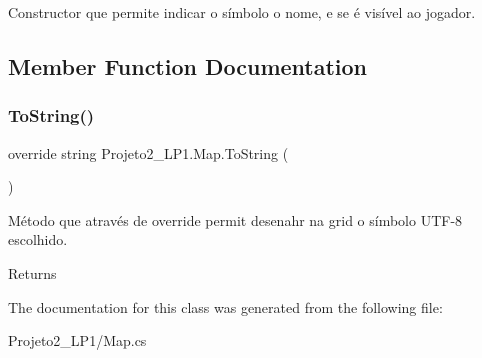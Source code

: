 Constructor que permite indicar o símbolo o nome, e se é visível ao jogador. 



\subsection{Member Function Documentation}
\mbox{\label{class_projeto2___l_p1_1_1_map_a4693bc7aa33a5c2c98d99dcd5dc1f524}} 
\subsubsection{\texorpdfstring{To\+String()}{ToString()}}
{\footnotesize\ttfamily override string Projeto2\+\_\+\+L\+P1.\+Map.\+To\+String (\begin{DoxyParamCaption}{ }\end{DoxyParamCaption})\hspace{0.3cm}{\ttfamily [inline]}}



Método que através de override permit desenahr na grid o símbolo U\+T\+F-\/8 escolhido. 

\begin{DoxyReturn}{Returns}

\end{DoxyReturn}


The documentation for this class was generated from the following file\+:\begin{DoxyCompactItemize}
\item 
Projeto2\+\_\+\+L\+P1/Map.\+cs\end{DoxyCompactItemize}
